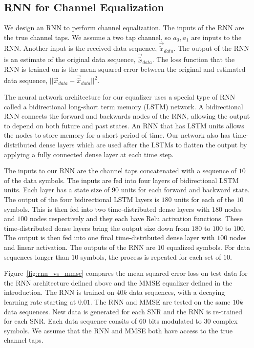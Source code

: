 \subsection{RNN for Channel Equalization}

We design an RNN to perform channel equalization.
The inputs of the RNN are the true channel taps.  We assume a two tap channel, so $a_0, a_1$ are inputs to the RNN.  Another input is the received data sequence, $\vec{\tilde{x}}_{data}$.
The output of the RNN is an estimate of the original data sequence, $\vec{\hat{x}}_{data}$. 
The loss function that the RNN is trained on is the mean squared error between the original and estimated data sequence, $||\vec{x}_{data}-\vec{\hat{x}}_{data}||^2$.

The neural network architecture for our equalizer uses a special type of RNN called a bidirectional long-short term memory (LSTM) network.  
A bidirectional RNN connects the forward and backwards nodes of the RNN, allowing the output to depend on both future and past states.
An RNN that has LSTM units allows the nodes to store memory for a short period of time.
Our network also has time-distributed dense layers which are used after the LSTMs to flatten the output by applying a fully connected dense layer at each time step.

The inputs to our RNN are the channel taps concatenated with a sequence of $10$ of the data symbols.  The inputs are fed into four layers of bidirectional LSTM units.  Each layer has a state size of $90$ units for each forward and backward state.  The output of the four bidirectional LSTM layers is $180$ units for each of the $10$ symbols.  
This is then fed into two time-distributed dense layers with $180$ nodes and $100$ nodes respectively and they each have Relu activation functions. These time-distributed dense layers bring the output size down from $180$ to $100$ to $100$.  The output is then fed into one final time-distributed dense layer with $100$ nodes and linear activation.  The outputs of the RNN are $10$ equalized symbols.  
For data sequences longer than $10$ symbols, the process is repeated for each set of $10$.


Figure~\ref{fig:rnn_vs_mmse} compares the mean squared error loss on test data for the RNN architecture defined above and the MMSE equalizer defined in the introduction.  
The RNN is trained on $40k$ data sequences, with a decaying learning rate starting at $0.01$.
The RNN and MMSE are tested on the same $10k$ data sequences.  New data is generated for each SNR and the RNN is re-trained for each SNR.  Each data sequence consits of $60$ bits modulated to $30$ complex symbols.
We assume that the RNN and MMSE both have access to the true channel taps.

